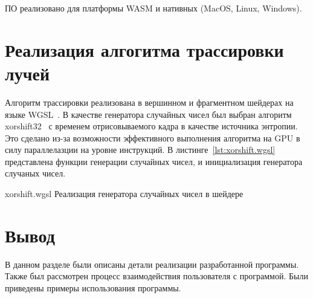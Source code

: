 ПО реализовано для платформы WASM и нативных (MacOS, Linux, Windows).

\section{Реализация алгогитма трассировки лучей}

Алгоритм трассировки реализована в 
вершинном и фрагментном шейдерах на языке WGSL~\cite{WebGPUSL}.
В качестве генератора случайных чисел был выбран алгоритм xorshift32~\cite{xorshift}
с временем отрисовываемого кадра в качестве источника энтропии. Это сделано
из-за возможности эффективного выполнения алгоритма на GPU в 
силу параллелазции на уровне инструкций. В листинге~\ref{lst:xorshift.wgsl} представлена 
функции генерации случайных чисел, и инициализация генератора случаных чисел.

    {xorshift.wgsl}
    {Реализация генератора случайных чисел в шейдере}

\section{Вывод}

В данном разделе были описаны детали реализации разработанной программы. 
Также был рассмотрен процесс взаимодействия пользователя с программой.
Были приведены примеры использования программы.
